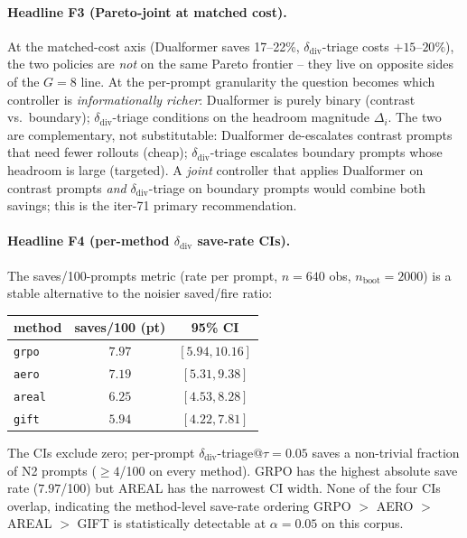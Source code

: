 \documentclass{article}
\begin{document}
\paragraph{Headline F3 (Pareto-joint at matched cost).}
At the matched-cost axis (Dualformer saves 17--22\%, $\delta_{\mathrm{div}}$-triage
costs $+15$--$20\%$), the two policies are \emph{not} on the same
Pareto frontier -- they live on opposite sides of the $G{=}8$ line.
At the per-prompt granularity the question becomes which controller is
\emph{informationally richer}: Dualformer is purely binary
(contrast vs.\ boundary); $\delta_{\mathrm{div}}$-triage conditions on
the headroom magnitude $\Delta_i$. The two are complementary, not
substitutable: Dualformer de-escalates contrast prompts that need
fewer rollouts (cheap); $\delta_{\mathrm{div}}$-triage escalates
boundary prompts whose headroom is large (targeted). A
\emph{joint} controller that applies Dualformer on contrast prompts
\emph{and} $\delta_{\mathrm{div}}$-triage on boundary prompts would
combine both savings; this is the iter-71 primary recommendation.

\paragraph{Headline F4 (per-method $\delta_{\mathrm{div}}$ save-rate CIs).}
The saves/100-prompts metric (rate per prompt, $n{=}640$ obs, $n_{\mathrm{boot}}{=}2000$) is a stable alternative to the noisier saved/fire ratio:
\begin{center}
\begin{tabular}{lcc}
\toprule
method & saves/100 (pt) & 95\% CI \\
\midrule
\texttt{grpo}  & $7.97$ & $[5.94, 10.16]$ \\
\texttt{aero}  & $7.19$ & $[5.31,  9.38]$ \\
\texttt{areal} & $6.25$ & $[4.53,  8.28]$ \\
\texttt{gift}  & $5.94$ & $[4.22,  7.81]$ \\
\bottomrule
\end{tabular}
\end{center}
The CIs exclude zero; per-prompt $\delta_{\mathrm{div}}$-triage@$\tau{=}0.05$
saves a non-trivial fraction of N2 prompts ($\geq 4$/100 on every method).
GRPO has the highest absolute save rate ($7.97$/100) but AREAL has the
narrowest CI width. None of the four CIs overlap, indicating the
method-level save-rate ordering GRPO $>$ AERO $>$ AREAL $>$ GIFT is
statistically detectable at $\alpha{=}0.05$ on this corpus.
\end{document}
